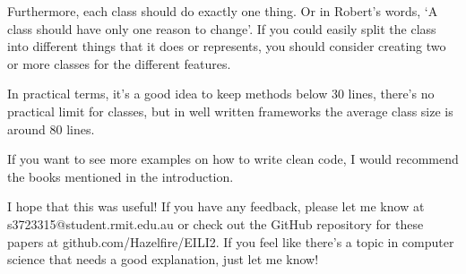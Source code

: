 \documentclass{article}
\begin{document}
  Furthermore, each class should do exactly one thing. Or in Robert's words,
  `A class should have only one reason to change'. If you could easily split
  the class into different things that it does or represents, you should consider creating two or more
  classes for the different features.

  In practical terms, it's a good idea to keep methods below 30 lines, there's
  no practical limit for classes, but in well written frameworks the average class
  size is around 80 lines.

  If you want to see more examples on how to write clean code, I would recommend
  the books mentioned in the introduction.

  I hope that this was useful! If you have any feedback, please let me know at
  s3723315@student.rmit.edu.au or check out the GitHub repository for these
  papers at github.com/Hazelfire/EILI2. If you feel like there's a topic in
  computer science that needs a good explanation, just let me know!
\end{document}
